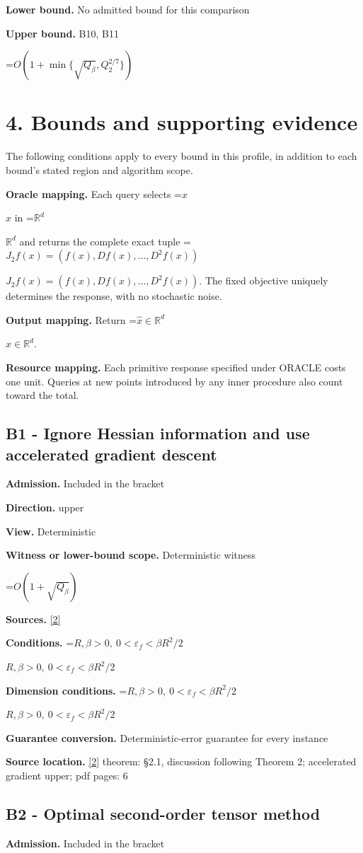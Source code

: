 \documentclass[10pt,a4paper]{article}
\newcommand{\AtlasMath}[1]{\par\begingroup\centering\setbox0=\hbox{$\displaystyle #1$}\ifdim\wd0>1.4\linewidth\typeout{ATLAS WIDE FORMULA: \the\wd0}\fi\ifdim\wd0>\linewidth\resizebox{\linewidth}{!}{\box0}\else\box0\fi\par\endgroup}
\newcommand{\AtlasInlineMath}[1]{\begingroup\setbox0=\hbox{$#1$}\ifdim\wd0>.4\linewidth\endgroup\AtlasMath{#1}\else\endgroup$#1$\fi}
\begin{document}
\textbf{Lower bound.} No admitted bound for this comparison

\textbf{Upper bound.} B10, B11

\AtlasMath{O(1+\min\{\sqrt{Q_\beta},Q_2^{2/7}\})}
\section{4. Bounds and supporting evidence}
The following conditions apply to every bound in this profile, in addition to each bound's stated region and algorithm scope.

\textbf{Oracle mapping.} Each query selects \AtlasInlineMath{x} in \AtlasInlineMath{\mathbb{R}^d} and returns the complete exact tuple \AtlasInlineMath{J_{2}f(x)=(f(x),Df(x),\ldots,D^{2}f(x))}. The fixed objective uniquely determines the response, with no stochastic noise.

\textbf{Output mapping.} Return \AtlasInlineMath{\widehat{x}\in \mathbb{R}^d}.

\textbf{Resource mapping.} Each primitive response specified under ORACLE costs one unit. Queries at new points introduced by any inner procedure also count toward the total.

\subsection{B1 - Ignore Hessian information and use accelerated gradient descent}
\textbf{Admission.} Included in the bracket

\textbf{Direction.} upper

\textbf{View.} Deterministic

\textbf{Witness or lower-bound scope.} Deterministic witness

\AtlasMath{O(1+\sqrt{Q_\beta})}
\textbf{Sources.} \href{https://arxiv.org/pdf/1705.07260v2}{[2]}

\textbf{Conditions.} \AtlasInlineMath{R,\beta>0,\ 0<\varepsilon_f<\beta R^2/2}

\textbf{Dimension conditions.} \AtlasInlineMath{R,\beta>0,\ 0<\varepsilon_f<\beta R^2/2}

\textbf{Guarantee conversion.} Deterministic-error guarantee for every instance

\textbf{Source location.} \href{https://arxiv.org/pdf/1705.07260v2}{[2]} theorem: §2.1, discussion following Theorem 2; accelerated gradient upper; pdf pages: 6

\subsection{B2 - Optimal second-order tensor method}
\textbf{Admission.} Included in the bracket
\end{document}
